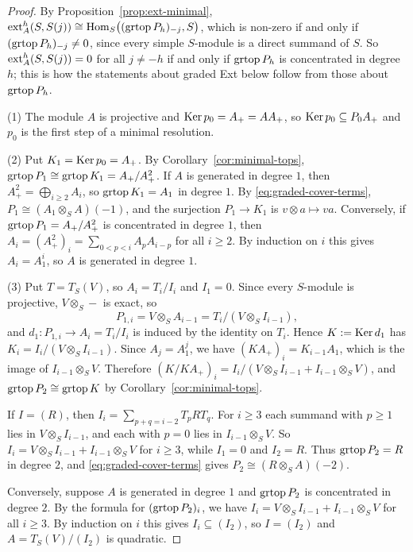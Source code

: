 \begin{proof}
By Proposition~\ref{prop:ext-minimal}, $\operatorname{ext}\nolimits_A^h(S,S(j))\cong\operatorname{Hom}\nolimits_S\bigl((\operatorname{grtop}\nolimits P_h)_{-j},S\bigr)$, which is non-zero if and only if $(\operatorname{grtop}\nolimits P_h)_{-j}\neq0$, since every simple $S$-module is a direct summand of $S$.
So $\operatorname{ext}\nolimits_A^h(S,S(j))=0$ for all $j\neq-h$ if and only if $\operatorname{grtop}\nolimits P_h$ is concentrated in degree $h$; this is how the statements about graded Ext below follow from those about $\operatorname{grtop}\nolimits P_h$.

(1) The module $A$ is projective and $\operatorname{Ker}\nolimits p_0=A_+=AA_+$, so $\operatorname{Ker}\nolimits p_0\subseteq P_0A_+$ and $p_0$ is the first step of a minimal resolution.

(2) Put $K_1=\operatorname{Ker}\nolimits p_0=A_+$.
By Corollary~\ref{cor:minimal-tops}, $\operatorname{grtop}\nolimits P_1\cong\operatorname{grtop}\nolimits K_1=A_+/A_+^2$.
If $A$ is generated in degree $1$, then $A_+^2=\bigoplus_{i\geq2}A_i$, so $\operatorname{grtop}\nolimits K_1=A_1$ in degree $1$.
By \eqref{eq:graded-cover-terms}, $P_1\cong(A_1\otimes_SA)(-1)$, and the surjection $P_1\to K_1$ is $v\otimes a\mapsto va$.
Conversely, if $\operatorname{grtop}\nolimits P_1=A_+/A_+^2$ is concentrated in degree $1$, then $A_i=(A_+^2)_i=\sum_{0<p<i}A_pA_{i-p}$ for all $i\geq2$.
By induction on $i$ this gives $A_i=A_1^i$, so $A$ is generated in degree $1$.

(3) Put $T=T_S(V)$, so $A_i=T_i/I_i$ and $I_1=0$.
Since every $S$-module is projective, $V\otimes_S-$ is exact, so
\[
P_{1,i}=V\otimes_SA_{i-1}=T_i/(V\otimes_SI_{i-1}),
\]
and $d_1:P_{1,i}\to A_i=T_i/I_i$ is induced by the identity on $T_i$.
Hence $K:=\operatorname{Ker}\nolimits d_1$ has $K_i=I_i/(V\otimes_SI_{i-1})$.
Since $A_j=A_1^j$, we have $(KA_+)_i=K_{i-1}A_1$, which is the image of $I_{i-1}\otimes_SV$.
Therefore $(K/KA_+)_i=I_i/(V\otimes_SI_{i-1}+I_{i-1}\otimes_SV)$, and $\operatorname{grtop}\nolimits P_2\cong\operatorname{grtop}\nolimits K$ by Corollary~\ref{cor:minimal-tops}.

If $I=(R)$, then $I_i=\sum_{p+q=i-2}T_pRT_q$.
For $i\geq3$ each summand with $p\geq1$ lies in $V\otimes_SI_{i-1}$, and each with $p=0$ lies in $I_{i-1}\otimes_SV$.
So $I_i=V\otimes_SI_{i-1}+I_{i-1}\otimes_SV$ for $i\geq3$, while $I_1=0$ and $I_2=R$.
Thus $\operatorname{grtop}\nolimits P_2=R$ in degree $2$, and \eqref{eq:graded-cover-terms} gives $P_2\cong(R\otimes_SA)(-2)$.

Conversely, suppose $A$ is generated in degree $1$ and $\operatorname{grtop}\nolimits P_2$ is concentrated in degree $2$.
By the formula for $(\operatorname{grtop}\nolimits P_2)_i$, we have $I_i=V\otimes_SI_{i-1}+I_{i-1}\otimes_SV$ for all $i\geq3$.
By induction on $i$ this gives $I_i\subseteq(I_2)$, so $I=(I_2)$ and $A=T_S(V)/(I_2)$ is quadratic.
\end{proof}

